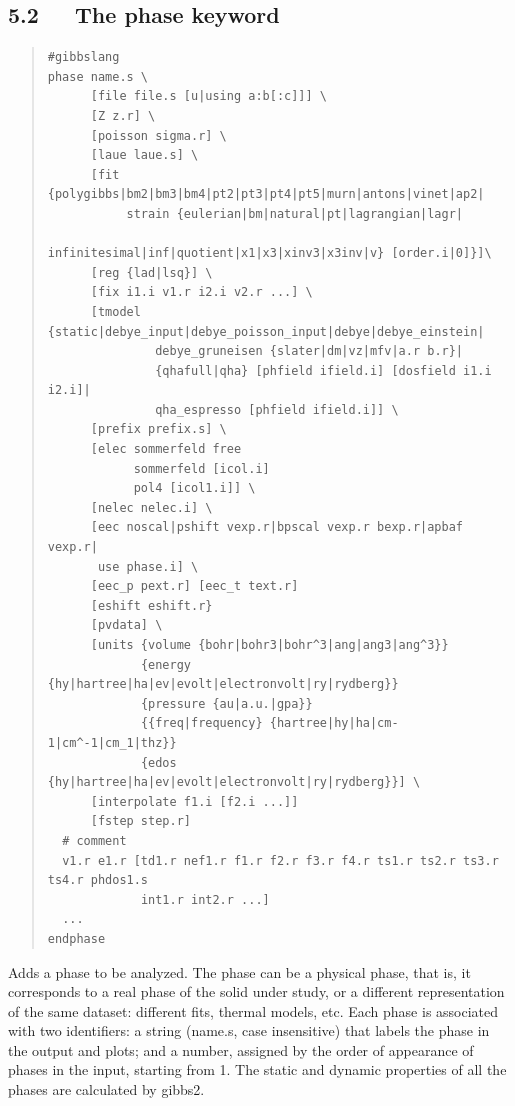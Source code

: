 \documentclass[a4paper]{article}
\begin{document}
\subsection{5.2~~~The phase keyword%
  \label{the-phase-keyword}%
}
%
\begin{quote}
\begin{verbatim}
#gibbslang
phase name.s \
      [file file.s [u|using a:b[:c]]] \
      [Z z.r] \
      [poisson sigma.r] \
      [laue laue.s] \
      [fit {polygibbs|bm2|bm3|bm4|pt2|pt3|pt4|pt5|murn|antons|vinet|ap2|
           strain {eulerian|bm|natural|pt|lagrangian|lagr|
                   infinitesimal|inf|quotient|x1|x3|xinv3|x3inv|v} [order.i|0]}]\
      [reg {lad|lsq}] \
      [fix i1.i v1.r i2.i v2.r ...] \
      [tmodel {static|debye_input|debye_poisson_input|debye|debye_einstein|
               debye_gruneisen {slater|dm|vz|mfv|a.r b.r}|
               {qhafull|qha} [phfield ifield.i] [dosfield i1.i i2.i]|
               qha_espresso [phfield ifield.i]] \
      [prefix prefix.s] \
      [elec sommerfeld free
            sommerfeld [icol.i]
            pol4 [icol1.i]] \
      [nelec nelec.i] \
      [eec noscal|pshift vexp.r|bpscal vexp.r bexp.r|apbaf vexp.r|
       use phase.i] \
      [eec_p pext.r] [eec_t text.r]
      [eshift eshift.r}
      [pvdata] \
      [units {volume {bohr|bohr3|bohr^3|ang|ang3|ang^3}}
             {energy {hy|hartree|ha|ev|evolt|electronvolt|ry|rydberg}}
             {pressure {au|a.u.|gpa}}
             {{freq|frequency} {hartree|hy|ha|cm-1|cm^-1|cm_1|thz}}
             {edos {hy|hartree|ha|ev|evolt|electronvolt|ry|rydberg}}] \
      [interpolate f1.i [f2.i ...]]
      [fstep step.r]
  # comment
  v1.r e1.r [td1.r nef1.r f1.r f2.r f3.r f4.r ts1.r ts2.r ts3.r ts4.r phdos1.s
             int1.r int2.r ...]
  ...
endphase
\end{verbatim}
\end{quote}

Adds a phase to be analyzed. The phase can be a physical phase, that
is, it corresponds to a real phase of the solid under study, or a
different representation of the same dataset: different fits, thermal
models, etc. Each phase is associated with two identifiers: a string
(name.s, case insensitive) that labels the phase in the output and
plots; and a number, assigned by the order of appearance of phases in
the input, starting from 1. The static and dynamic properties of all
the phases are calculated by gibbs2.
\end{document}

